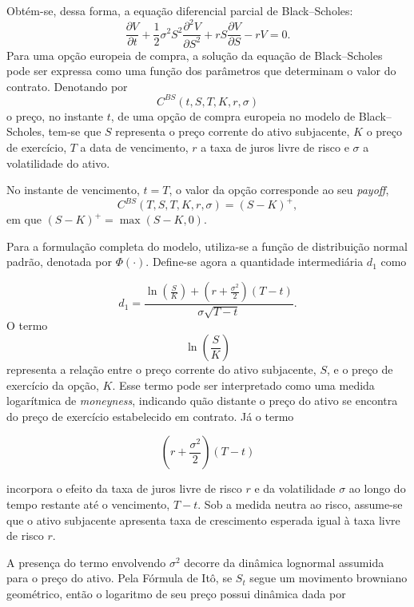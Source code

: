 Obtém-se, dessa forma, a equação diferencial parcial de Black--Scholes:
\begin{equation}
\frac{\partial V}{\partial t}
+
\frac{1}{2}\sigma^2 S^2
\frac{\partial^2 V}{\partial S^2}
+
rS\frac{\partial V}{\partial S}
-
rV
=
0.
\end{equation}
Para uma opção europeia de compra, a solução da equação de Black--Scholes
pode ser expressa como uma função dos parâmetros que determinam o valor do
contrato. Denotando por
\begin{equation}
C^{BS}(t,S,T,K,r,\sigma)
\end{equation}o preço, no instante $t$, de uma opção de compra europeia no modelo de
Black--Scholes, tem-se que $S$ representa o preço corrente do ativo
subjacente, $K$ o preço de exercício, $T$ a data de vencimento, $r$ a taxa
de juros livre de risco e $\sigma$ a volatilidade do ativo.

No instante de vencimento, $t=T$, o valor da opção corresponde ao seu
\textit{payoff},
\begin{equation}
C^{BS}(T,S,T,K,r,\sigma)
=
(S-K)^{+},
\end{equation}
em que $(S-K)^{+}=\max(S-K,0)$.

Para a formulação completa do modelo, utiliza-se a função de distribuição
normal padrão, denotada por $\Phi(\cdot)$. Define-se agora a quantidade
intermediária $d_1$ como

\begin{equation}
d_1 =
\frac{
\ln\left(\frac{S}{K}\right)
+
\left(r+\frac{\sigma^2}{2}\right)(T-t)
}{
\sigma\sqrt{T-t}
}.
\end{equation}
O termo
\[
\ln\left(\frac{S}{K}\right)
\]
representa a relação entre o preço corrente do ativo subjacente, $S$, e o
preço de exercício da opção, $K$. Esse termo pode ser interpretado como uma
medida logarítmica de \textit{moneyness}, indicando quão distante o preço do
ativo se encontra do preço de exercício estabelecido em contrato.
Já o termo

\[
\left(r+\frac{\sigma^2}{2}\right)(T-t)
\]

incorpora o efeito da taxa de juros livre de risco $r$ e da volatilidade
$\sigma$ ao longo do tempo restante até o vencimento, $T-t$. Sob a medida
neutra ao risco, assume-se que o ativo subjacente apresenta taxa de
crescimento esperada igual à taxa livre de risco $r$.

A presença do termo envolvendo $\sigma^2$ decorre da dinâmica lognormal
assumida para o preço do ativo. Pela Fórmula de Itô, se $S_t$ segue um
movimento browniano geométrico, então o logaritmo de seu preço possui
dinâmica dada por

